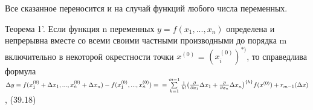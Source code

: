 \documentclass[10 pt]{article}
\begin{document}
	Все сказанное переносится и на случай функций любого числа переменных.
	
	Теорема 1'. Если функция n переменных $y = f(x_1, ..., x_n)$ определена и непрерывна вместе
	со всеми своими частными производными до порядка m включительно в некоторой окрестности точки
	$x^{(0)}$ = $(x_{i}^{(0)})^{*)}$, то справедлива формула \\
	$\Delta y = f(x_{1}^{(0)} + \Delta x_{1}, ..., x_{n}^{(0)}+\Delta x_{n}) - f(x_{1}^{(0)}, ...,  x_{n}^{(0)}) = \\ = \sum\limits_{k = 1}^{m-1} \frac{1}{k!} \bigl( \frac{\partial}{\partial x_1} \Delta x_1 + \frac{\partial}{\partial x_n} \Delta x_n \bigr)^{\{k\}} f(x^{(0)}) + r_{m-1} (\Delta x) $, (39.18)
 
\end{document}
